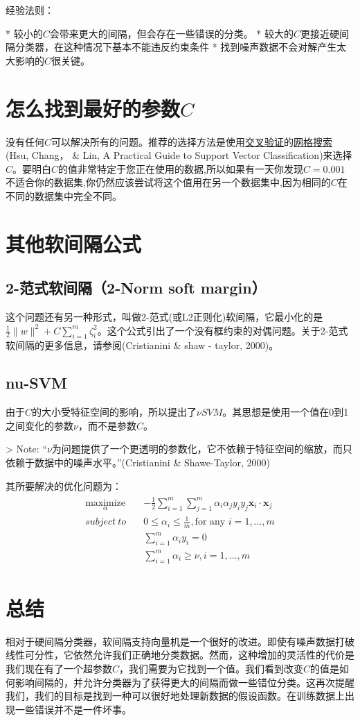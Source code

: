 经验法则：

* 较小的$C$会带来更大的间隔，但会存在一些错误的分类。
* 较大的$C$更接近硬间隔分类器，在这种情况下基本不能违反约束条件
* 找到噪声数据不会对解产生太大影响的$C$很关键。



\section{怎么找到最好的参数$C$}

没有任何$C$可以解决所有的问题。推荐的选择方法是使用\href{http://scikit-learn.org/stable/modules/cross_validation.html}{交叉验证}的\href{http://scikit-learn.org/stable/modules/grid_search.html}{网格搜索}(Hsu, Chang， \& Lin, A Practical Guide to Support Vector Classification)来选择$C$。要明白$C$的值非常特定于您正在使用的数据,所以如果有一天你发现$C = 0.001$不适合你的数据集,你仍然应该尝试将这个值用在另一个数据集中,因为相同的$C$在不同的数据集中完全不同。

\section{其他软间隔公式}

\subsection{2-范式软间隔（2-Norm soft margin）}

这个问题还有另一种形式，叫做2-范式(或L2正则化)软间隔，它最小化的是$\frac{1}{2} \|w\|^2 + C \sum\limits_{i=1}^m \zeta_i^2$。这个公式引出了一个没有框约束的对偶问题。关于2-范式软间隔的更多信息，请参阅(Cristianini \& shaw - taylor, 2000)。

\subsection{nu-SVM}

由于$C$的大小受特征空间的影响，所以提出了$\nu SVM$。其思想是使用一个值在0到1之间变化的参数$\nu$，而不是参数$C$。

> Note: “$\nu$为问题提供了一个更透明的参数化，它不依赖于特征空间的缩放，而只依赖于数据中的噪声水平。”(Cristianini \& Shawe-Taylor, 2000)

其所要解决的优化问题为：
\begin{gather*}
\begin{align*}
\underset{\alpha}{\text{maximize}} \quad &  - \frac{1}{2}\sum_{i=1}^m\sum_{j=1}^m \alpha_i \alpha_j y_i y_j \mathbf{x}_i \cdot \mathbf{x}_j  \\
subject\ to \quad & 0 \leq \alpha_i \leq \frac{1}{m},\text{for any }i=1,\dots,m \\
& \sum_{i=1}^m \alpha_i y_i = 0 \\
& \sum_{i=1}^m \alpha_i \geq \nu,i=1,\dots,m
\end{align*}
\end{gather*}
\section{总结}

相对于硬间隔分类器，软间隔支持向量机是一个很好的改进。即使有噪声数据打破线性可分性，它依然允许我们正确地分类数据。然而，这种增加的灵活性的代价是我们现在有了一个超参数$C$，我们需要为它找到一个值。我们看到改变$C$的值是如何影响间隔的，并允许分类器为了获得更大的间隔而做一些错位分类。这再次提醒我们，我们的目标是找到一种可以很好地处理新数据的假设函数。在训练数据上出现一些错误并不是一件坏事。